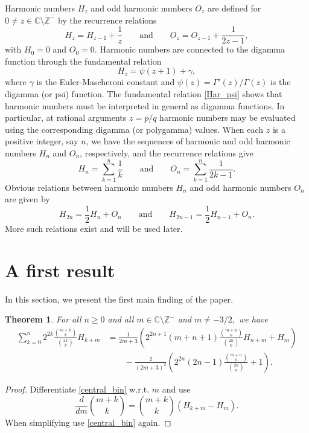 \documentclass[11pt,reqno]{amsart}
\theoremstyle{plain}
\numberwithin{equation}{section}
\newtheorem{theorem}[thm]{Theorem}
\begin{document}
Harmonic numbers $H_z$ and odd harmonic numbers $O_z$ are defined for $0\ne z\in\mathbb C\setminus\mathbb Z^{-}$ by the recurrence relations
\begin{equation*}
H_z = H_{z - 1} + \frac{1}{z} \qquad \text{and} \qquad O_z = O_{z - 1} + \frac{1}{2z - 1},
\end{equation*}
with $H_0=0$ and $O_0=0$. Harmonic numbers are connected to the digamma function through the fundamental relation \cite{Srivastava}
\begin{equation}\label{Har_psi}
H_z = \psi(z + 1) + \gamma,
\end{equation}
where $\gamma$ is the Euler-Mascheroni constant and $\psi(z)=\Gamma'(z)/\Gamma(z)$ is the digamma (or psi) function. 
The fundamental relation \eqref{Har_psi} shows that harmonic numbers must be interpreted in general as digamma functions.
In particular, at rational arguments $z=p/q$ harmonic numbers may be evaluated using the corresponding digamma (or polygamma) values.
When each $z$ is a positive integer, say $n$, we have the sequences of harmonic and odd harmonic numbers $H_n$ and $O_n$, respectively,
and the recurrence relations give
\begin{equation*}
H_n =\sum_{k=1}^n \frac{1}{k} \qquad \text{and} \qquad O_n =\sum_{k=1}^n \frac{1}{2k-1}.
\end{equation*}
Obvious relations between harmonic numbers $H_n$ and odd harmonic numbers $O_n$ are given by
\begin{equation}\label{eq.har_oddhar}
H_{2n} = \frac{1}{2} H_n + O_n \qquad \text{and} \qquad H_{2n - 1} = \frac{1}{2}H_{n - 1} + O_n.
\end{equation}
More such relations exist and will be used later.  

\section{A first result}

In this section, we present the first main finding of the paper.

\begin{theorem}\label{main_thm1}
For all $n\geq 0$ and all $m\in\mathbb C\setminus\mathbb Z^{-}$ and $m\neq -3/2,$ we have
\begin{align}
\sum_{k=0}^n 2^{2k} \frac{\binom{m+k}{k}}{\binom{2k}{k}} H_{k+m} &= \frac{1}{2m+3}\left ( 2^{2n+1} (m+n+1)\frac{\binom{m+n}{n}}{\binom{2n}{n}} H_{n+m} + H_m \right ) \nonumber \\
&\qquad - \frac{2}{(2m+3)^2} \left (2^{2n} (2n-1)\frac{\binom{m+n}{n}}{\binom{2n}{n}} + 1\right ).
\end{align}
\end{theorem}
\begin{proof}
Differentiate \eqref{central_bin} w.r.t. $m$ and use
$$\frac{d}{dm} \binom{m+k}{k} = \binom{m+k}{k} (H_{k+m}-H_m).$$
When simplifying use \eqref{central_bin} again.
\end{proof}
\end{document}
